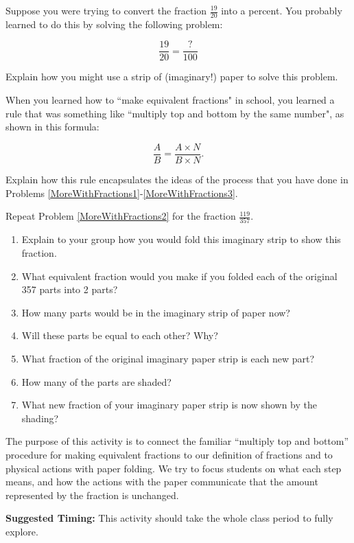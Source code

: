 \documentclass[nooutcomes]{ximera}
\begin{document}
\newpage

\begin{problem}\label{MoreWithFractions3}
Suppose you were trying to convert the fraction $\frac{19}{20}$ into a percent.  You probably learned to do this by solving the following problem:

\[ \frac{19}{20} = \frac{?}{100} \]

Explain how you might use a strip of (imaginary!) paper  to solve this problem.
\end{problem}




\begin{problem}
When you learned how to ``make equivalent fractions" in school, you learned a rule that was something like ``multiply top and bottom by the same number", as shown in this formula:

  \[ \frac{A}{B} = \frac{A \times N}{B \times N}. \]

Explain how this rule encapsulates the ideas of the process that you have done in Problems \ref{MoreWithFractions1}-\ref{MoreWithFractions3}.
\end{problem}





\begin{problem}
 Repeat Problem \ref{MoreWithFractions2} for the fraction $\frac{119}{357}$. 
\begin{enumerate}
    \item Explain to your group how you would fold this imaginary strip to show this fraction.    
    \item What equivalent fraction would you make if you folded each of the original 357 parts into 2 parts?
   \item   How many parts would be in the imaginary strip of paper now?
    \item  Will these parts be equal to each other?  Why?
    \item   What fraction of the original imaginary paper strip is each new part?
    \item   How many of the parts are shaded?
    \item   What new fraction of your imaginary paper strip is now shown by the shading?  
\end{enumerate}
\end{problem}


\newpage

\begin{instructorNotes}
The purpose of this activity is to connect the familiar ``multiply top and bottom'' procedure for making equivalent fractions to our definition of fractions and to physical actions with paper folding.  We try to focus students on what each step means, and how the actions with the paper communicate that the amount represented by the fraction is unchanged.




{\bf Suggested Timing:} This activity should take the whole class period to fully explore.
\end{instructorNotes}
\end{document}
